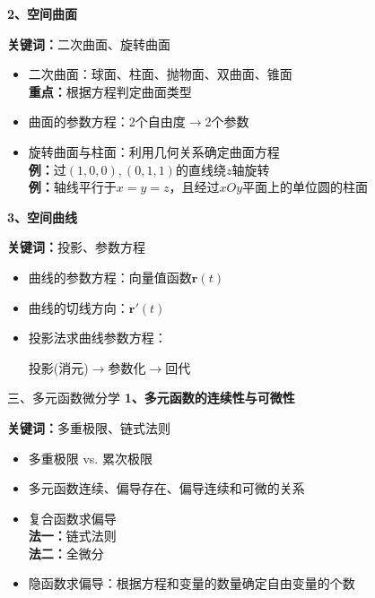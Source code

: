 \begin{frame}
	\linespread{1.2}
	{\bf 2、空间曲面}\pause 
	
	{\b{\bf 关键词：}\pause 二次曲面、\pause 旋转曲面}\pause 
	\begin{itemize}
	  \item 二次曲面：\pause 球面、\pause 柱面、\pause 抛物面、\pause 双曲面、\pause 锥面\pause \\
	  {\bf 重点：}\pause 根据方程判定曲面类型\pause 
	  \item 曲面的参数方程：\pause 2个自由度$\to$2个参数\pause 
	  \item 旋转曲面与柱面：\pause 利用几何关系确定曲面方程\pause \\
	  {{\bf 例：}过$(1,0,0),(0,1,1)$的直线绕$z$轴旋转}\pause \\
	  {{\bf 例：}轴线平行于$x=y=z$，且经过$xOy$平面上的单位圆的柱面}
	\end{itemize}
\end{frame}

\begin{frame}
	\linespread{1.2}
	{\bf 3、空间曲线}\pause 
	
	{\b{\bf 关键词：}\pause 投影、\pause 参数方程}\pause 
	\begin{itemize}
	  \item 曲线的参数方程：\pause 向量值函数$\bm{r}(t)$\pause 
	  \item 曲线的切线方向：\pause $\bm{r}'(t)$\pause 
	  \item 投影法求曲线参数方程：\pause \\
	  \centerline{\alert{投影(消元)$\to$参数化$\to$回代}}
	\end{itemize}
\end{frame}

\begin{frame}{三、多元函数微分学}
	\linespread{1.2}\pause 
	{\bf 1、多元函数的连续性与可微性}\pause 
	
	{\b{\bf 关键词：}\pause 多重极限、\pause 链式法则}\pause 
	\begin{itemize}
	  \item 多重极限 vs. 累次极限\pause 
	  \item 多元函数连续、偏导存在、偏导连续和可微的关系\pause 
	  \item 复合函数求偏导\pause \\
	  {\bf 法一：}链式法则\pause \\
	  {\bf 法二：}全微分\pause 
	  \item 隐函数求偏导：\pause 根据方程和变量的数量确定自由变量的个数
	\end{itemize}
\end{frame}

